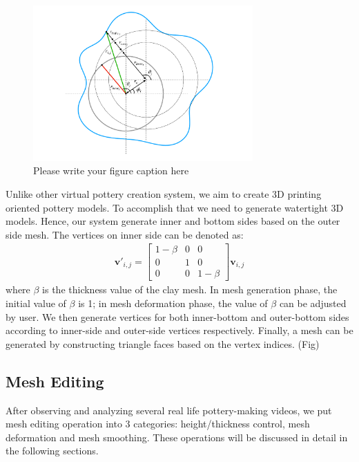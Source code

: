 \begin{figure}
  \includegraphics[width=0.75\textwidth]{f2.pdf}
\caption{Please write your figure caption here}
\label{fig:1}       %
\end{figure}

Unlike other virtual pottery creation system, we aim to create 3D printing oriented pottery models. To accomplish that we need to generate watertight 3D models. Hence, our system generate inner and bottom sides based on the outer side mesh. The vertices on inner side can be denoted as:
\begin{equation}
\begin{split}
\mathbf{v'}_{i,j} = 
\begin{bmatrix}
1 - \beta & 0 & 0 \\
0 & 1 & 0 \\ 
0 & 0 & 1 - \beta 
\end{bmatrix}
\mathbf{v}_{i,j}
\end{split}
\end{equation}
where $\beta$ is the thickness value of the clay mesh. In mesh generation phase, the initial value of $\beta$ is 1; in mesh deformation phase, the value of $\beta$ can be adjusted by user.
We then generate vertices for both inner-bottom and outer-bottom sides according to inner-side and outer-side vertices respectively. Finally, a mesh can be generated by constructing triangle faces based on the vertex indices. (Fig)


\subsection{Mesh Editing}
\label{sec:4.2}
After observing and analyzing several real life pottery-making videos, we put mesh editing operation into 3 categories: height/thickness control, mesh deformation and mesh smoothing. These operations will be discussed in detail in the following sections.

